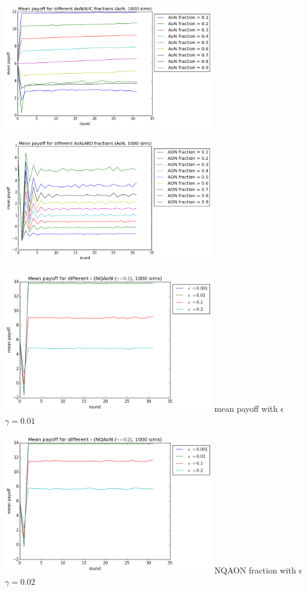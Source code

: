 \documentclass[letterpaper]{article}
\begin{document}
\vspace{5 mm}

\includegraphics[width=3.6in,angle=0]{img/meanpayoff_AONAllCfractions_aon.png}
\label{fig8}
\vspace{5 mm}


\includegraphics[width=3.6in,angle=0]{img/meanpayoff_AONAllDfractions_aon.png}
\label{fig9}
\vspace{5 mm}


\includegraphics[width=3.6in,angle=0]{img/meanpayoff_epsilon_nqaongamma01.png}
 {mean payoff with $\epsilon$ $\gamma=0.01$}
\label{fig11}
\vspace{5 mm}

\includegraphics[width=3.6in,angle=0]{img/meanpayoff_epsilon_nqaongamma02.png}
 {NQAON fraction with $\epsilon$ $\gamma=0.02$}
\label{fig11}
\vspace{5 mm}
\end{document}
